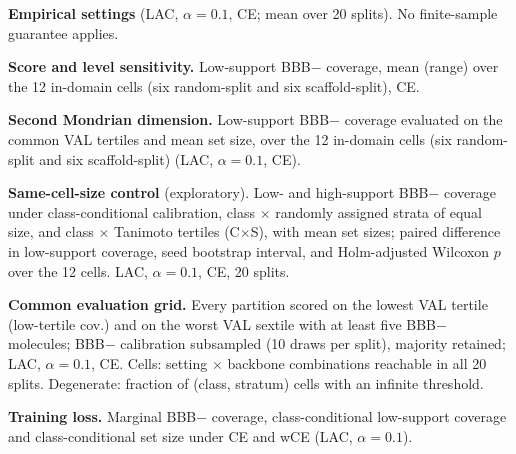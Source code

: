 \documentclass[10pt]{article}
\begin{document}
\begin{table}[!htbp]\centering\scriptsize
\caption{\textbf{Empirical settings} (LAC, $\alpha=0.1$, CE; mean over 20 splits). No finite-sample guarantee applies.}\label{tab:shift}
\resizebox{\linewidth}{!}{}
\end{table}

\begin{table}[!htbp]\centering\scriptsize
\caption{\textbf{Score and level sensitivity.} Low-support BBB$-$ coverage, mean (range) over the 12 in-domain cells (six random-split and six scaffold-split), CE.}\label{tab:rsc}

\end{table}

\begin{table}[!htbp]\centering\scriptsize
\caption{\textbf{Second Mondrian dimension.} Low-support BBB$-$ coverage evaluated on the common VAL tertiles and mean set size, over the 12 in-domain cells (six random-split and six scaffold-split) (LAC, $\alpha=0.1$, CE).}\label{tab:rs}

\end{table}

\begin{table}[!htbp]\centering\scriptsize
\caption{\textbf{Same-cell-size control} (exploratory). Low- and high-support BBB$-$ coverage under class-conditional calibration, class $\times$ randomly assigned strata of equal size, and class $\times$ Tanimoto tertiles (C$\times$S), with mean set sizes; paired difference in low-support coverage, seed bootstrap interval, and Holm-adjusted Wilcoxon $p$ over the 12 cells. LAC, $\alpha=0.1$, CE, 20 splits.}\label{tab:randstrata}
\resizebox{\linewidth}{!}{}
\end{table}

\begin{table}[!htbp]\centering\scriptsize
\caption{\textbf{Common evaluation grid.} Every partition scored on the lowest VAL tertile (low-tertile cov.) and on the worst VAL sextile with at least five BBB$-$ molecules; BBB$-$ calibration subsampled (10 draws per split), majority retained; LAC, $\alpha=0.1$, CE. Cells: setting $\times$ backbone combinations reachable in all 20 splits. Degenerate: fraction of (class, stratum) cells with an infinite threshold.}\label{tab:grid}
\resizebox{\linewidth}{!}{}
\end{table}

\begin{table}[!htbp]\centering\scriptsize
\caption{\textbf{Training loss.} Marginal BBB$-$ coverage, class-conditional low-support coverage and class-conditional set size under CE and wCE (LAC, $\alpha=0.1$).}\label{tab:loss}

\end{table}
\end{document}
